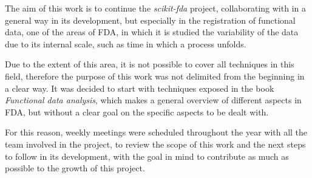 The aim of this work is to continue the \textit{scikit-fda} project,
collaborating with in a general way in its development, but especially in the
registration of functional data, one of the areas of FDA, in which it is studied the
variability of the data due to its internal scale, such as time
in which a process unfolds.

Due to the extent of this area, it is not possible
to cover all techniques in this field, therefore the purpose of this work was
not delimited from the beginning in a clear way.
It was decided to start with techniques
exposed in the book \textit{Functional data analysis}\cite{Ramsay2005},
which makes a general overview of different
aspects in FDA, but without a clear goal on the specific
aspects to be dealt with.

For this reason, weekly meetings were scheduled throughout the year with all the
team involved in the project, to review the scope of this work and the next
steps to follow in its development, with the goal in mind to contribute as much
as possible to the growth of this project.

